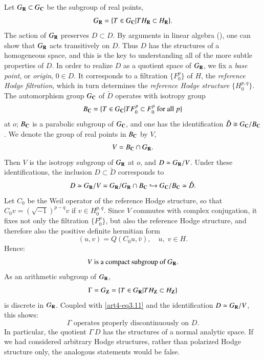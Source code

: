 Let $G_{\mathbf{R}} \subset G_{\mathbf{C}}$ be the subgroup of real points,
\begin{equation}
G_{\mathbf{R}} = \{T \in G_{\mathbf{C}} | T H_{\mathbf{R}} \subset H_{\mathbf{R}}\} .\label{art4-eq3.7}
\end{equation}
The action of $G_{\mathbf{R}}$ preserves $D \subset D$. By arguments in linear algebra (\cf \cite{art4-key18}), one can show that $G_{\mathbf{R}}$ acts transitively on $D$. Thus $D$ has the structures of a homogeneous space, and this is the key to understanding all of the more subtle properties of $D$. In order to realize $D$ as a quotient space of $G_{\mathbf{R}}$, we fix a \textit{base point}, or \textit{origin}, $0 \in D$. It corresponds to a filtration $\{F^p_0\}$ of $H$, the \textit{reference Hodge filtration}, which in turn determines the \textit{reference Hodge structure} $\{H^{p,q}_0\}$. The automorphism group $G_{\mathbf{C}}$ of $\check{D}$ operates with isotropy group
\begin{equation}
B_{\mathbf{C}} = \{T \in G_{\mathbf{C}} | T F^p_0 \subset F^p_0 \text{ for all  } p\}\label{art4-eq3.8}
\end{equation}
at $o$; $B_{\mathbf{C}}$ is a parabolic subgroup of $G_{\mathbf{C}}$, and one has the identification $\check{D} \cong G_{\mathbf{C}}/B_{\mathbf{C}}$. We denote the group of real points in $B_{\mathbf{C}}$ by $V$, \ie
\begin{equation}
V = B_{\mathbf{C}} \cap G_{\mathbf{R}}. \label{art4-eq3.9}
\end{equation}
Then $V$ is the isotropy subgroup of $G_{\mathbf{R}}$ at $o$, and $D \simeq G_{\mathbf{R}} /V$. Under these identifications, the inclusion $D \subset \check{D}$ corresponds to
\begin{equation}
D \simeq G_{\mathbf{R}} / V = G_{\mathbf{R}} / G_{\mathbf{R}} \cap B_{\mathbf{C}} \hookrightarrow G_{\mathbf{C}} / B_{\mathbf{C}} \simeq \check{D}. 
\label{art4-3.10}
\end{equation}
Let $C_0$ be the Weil operator of the reference Hodge structure, so that $C_0 v = (\sqrt{-1})^{p-q} v$ if $v \in H^{p,q}_0$. Since $V$ commutes with complex conjugation, it fixes not only the filtration $\{F^p_0\}$, but also the reference Hodge structure, and therefore also the positive definite hermitian form
$$
(u,v) = Q (C_0 u, \bar{v}), \quad u, \; v \in H.
$$
Hence:\pageoriginale
\begin{equation}
V \text{ is a compact subgroup of } G_{\mathbf{R}}. \label{art4-eq3.11}
\end{equation}
As an arithmetic subgroup of $G_{\mathbf{R}}$,
$$
\Gamma = G_{\mathbf{Z}} = \{T \in G_{\mathbf{R}} | T H_{\mathbf{Z}} \subset H_{\mathbf{Z}}\}
$$
is discrete in $G_{\mathbf{R}}$. Coupled with \eqref{art4-eq3.11} and the identification $D \simeq G_{\mathbf{R}} / V$, this shows:
\begin{equation}
\Gamma \text{ operates properly discontinuously on } D. 
\label{art4-eq3.12}
\end{equation}
In particular, the quotient $\Gamma \ D$ has the structures of a normal analytic space. If we had considered arbitrary Hodge structures, rather than polarized Hodge structure only, the analogous statements would be false.

